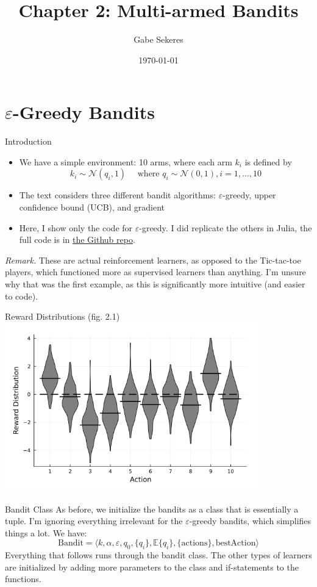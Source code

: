 \documentclass{beamer}
\title{Chapter 2: Multi-armed Bandits}
\date{\today}
\author{Gabe Sekeres}
\institute{Cornell University}
\begin{document}
  \maketitle
  
\section{$\varepsilon$-Greedy Bandits}
  
\begin{frame}{Introduction}
	\begin{itemize}
		\item We have a simple environment: 10 arms, where each arm $k_i$ is defined by \[k_i \sim \mathcal{N}(q_i,1) \quad \text{ where } q_i \sim \mathcal{N}(0,1), i = 1,\dots,10\]
		\item The text considers three different bandit algorithms: $\varepsilon$-greedy, upper confidence bound (UCB), and gradient
		\item Here, I show only the code for $\varepsilon$-greedy. I did replicate the others in Julia, the full code is in \alert{\href{https://github.com/gsekeres/cornell_theory_reading_group_RL/tree/main/chapter02}{the Github repo}}.
	\end{itemize}
	\emph{Remark.} These are actual reinforcement learners, as opposed to the Tic-tac-toe players, which functioned more as supervised learners than anything. I'm unsure why that was the first example, as this is significantly more intuitive (and easier to code).
\end{frame}
  
 \begin{frame}{Reward Distributions (fig. 2.1)}
 	\includegraphics[width=11cm]{ten_armed_testbed_violin.png}
 \end{frame}
 
 \begin{frame}{Bandit Class}
 	As before, we initialize the bandits as a class that is essentially a tuple. I'm ignoring everything irrelevant for the $\varepsilon$-greedy bandits, which simplifies things a lot. We have: 
 	\[
 	\text{Bandit} = \langle k, \alpha, \varepsilon, q_0, \{q_i\},\mathbb{E}\{q_i\}, \{\text{actions}\}, \text{bestAction}\rangle 
 	\]
 	Everything that follows runs through the bandit class. The other types of learners are initialized by adding more parameters to the class and if-statements to the functions.
 \end{frame}
 
\end{document}
